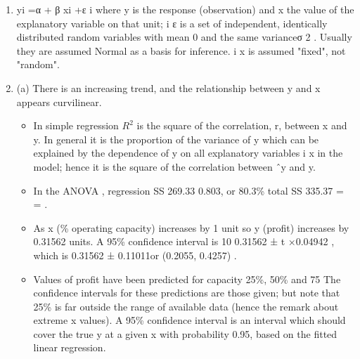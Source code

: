 \documentclass[a4paper,12pt]{article}
\begin{document}
\begin{enumerate}
\item  yi =α + β xi +ε i
where y is the response (observation) and x the value of the explanatory variable on
that unit; { } i
ε is a set of independent, identically distributed random variables with
mean 0 and the same varianceσ 2 . Usually they are assumed Normal as a basis for
inference. i x is assumed "fixed", not "random".
\item  (a) There is an increasing trend, and the relationship between y and x
appears curvilinear.
\begin{itemize}
\item In simple regression $R^2$ is the square of the correlation, r, between x
and y. In general it is the proportion of the variance of y which can be
explained by the dependence of y on all explanatory variables { } i x in the
model; hence it is the square of the correlation between ˆy and y.
\item In the ANOVA , regression SS 269.33 0.803, or 80.3\%
total SS 335.37
= = .
\item As x (\% operating capacity) increases by 1 unit so y (profit) increases
by 0.31562 units.
A 95\% confidence interval is 10 0.31562 ± t ×0.04942 , which is
0.31562 ± 0.11011or (0.2055, 0.4257) .
\item Values of profit have been predicted for capacity 25\%, 50\% and 75%
The confidence intervals for these predictions are those given; but note that
25\% is far outside the range of available data (hence the remark about extreme
x values). A 95\% confidence interval is an interval which should cover the
true y at a given x with probability 0.95, based on the fitted linear regression.
\end{itemize}


\end{enumerate}
\end{document}
